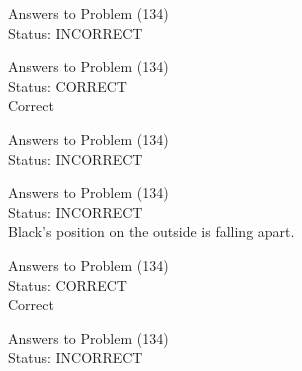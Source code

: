 \documentclass[11pt]{article}
\begin{document}
\begin{minipage}[t]{0.5\textwidth}
  {\centering
  
  Answers to Problem (134)\\
  Status: INCORRECT\\
  
  }
\end{minipage}
\begin{minipage}[t]{0.5\textwidth}
  {\centering
  
  Answers to Problem (134)\\
  Status: CORRECT\\
  Correct\\
  }
\end{minipage}
\begin{minipage}[t]{0.5\textwidth}
  {\centering
  
  Answers to Problem (134)\\
  Status: INCORRECT\\
  
  }
\end{minipage}
\begin{minipage}[t]{0.5\textwidth}
  {\centering
  
  Answers to Problem (134)\\
  Status: INCORRECT\\
  Black's position on the outside is falling apart.\\
  }
\end{minipage}
\begin{minipage}[t]{0.5\textwidth}
  {\centering
  
  Answers to Problem (134)\\
  Status: CORRECT\\
  Correct\\
  }
\end{minipage}
\begin{minipage}[t]{0.5\textwidth}
  {\centering
  
  Answers to Problem (134)\\
  Status: INCORRECT\\
  
  }
\end{minipage}
\end{document}
